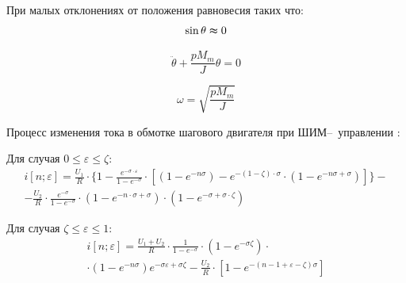 При малых отклонениях от положения равновесия таких что:
\begin{equation}
    \sin{\theta} \thickapprox 0
\end{equation}

\begin{equation}
    \label{rotor_like_harmonical_oscilator_equation}
    \ddot{\theta} + \frac{p M_{m}}{J} \theta = 0
\end{equation}

\begin{equation}
    \label{friquent_for_rotor_self_oscilating}
    \omega = \sqrt{ \frac{p M_{m}}{J} }
\end{equation}

Процесс изменения тока в обмотке шагового двигателя при ШИМ--~уп\-рав\-лен\-ии
\cite[гл. 6.4, стр. 239]{Chilikin}:

Для случая $0 \le \varepsilon \le \zeta$:
\begin{equation}
    \label{winding_current_with_pwm_control_1}
    \begin{split}
    i[ n; \varepsilon ] = \frac{ U_1 }{ R }
                            \cdot \{ 1
                                     - \frac { e^{ -\sigma \cdot \varepsilon } } { 1 - e^{-\sigma} }
                                            \cdot [ (1 - e^{-n\sigma})
                                                    - e^{ -(1 - \zeta) \cdot \sigma }
                                                        \cdot ( 1 - e^{-n\sigma + \sigma} )
                                                  ]
                                  \} - \\
                        - \frac{ U_2 }{ R }
                            \cdot \frac {e^{-\sigma}} {1 - e^{-\sigma}}
                            \cdot ( 1 - e^{ -n \cdot \sigma + \sigma } )
                            \cdot ( 1 - e^{ -\sigma + \sigma \cdot \zeta } )
    \end{split}
\end{equation}

Для случая $\zeta \le \varepsilon \le 1$:
\begin{equation}
    \label{winding_current_with_pwm_control_0}
    \begin{split}
    i[n; \varepsilon] =
        \frac{ U_{1} + U_{2} }{ R }
            \cdot \frac{ 1 }{ 1 - e^{-\sigma} }
            \cdot (1 - e^{-\sigma\zeta}) \cdot \\
            \cdot (1 - e^{-n\sigma})e^{-\sigma\varepsilon + \sigma\zeta}
        - \frac{ U_{2} }{ R }
            \cdot [ 1 - e^{ -( n - 1 + \varepsilon - \zeta ) \sigma } ]
    \end{split}
\end{equation}

